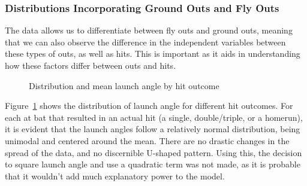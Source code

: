 \documentclass[
  letterpaper,
  DIV=11,
  numbers=noendperiod]{scrartcl}
\begin{document}
\subsubsection{Distributions Incorporating Ground Outs and Fly
Outs}\label{distributions-incorporating-ground-outs-and-fly-outs}

The data allows us to differentiate between fly outs and ground outs,
meaning that we can also observe the difference in the independent
variables between these types of outs, as well as hits. This is
important as it aids in understanding how these factors differ between
outs and hits.

\begin{figure}[H]


\caption{\label{fig-la-dist}Distribution and mean launch angle by hit
outcome}

\end{figure}%

Figure~\ref{fig-la-dist} shows the distribution of launch angle for
different hit outcomes. For each at bat that resulted in an actual hit
(a single, double/triple, or a homerun), it is evident that the launch
angles follow a relatively normal distribution, being unimodal and
centered around the mean. There are no drastic changes in the spread of
the data, and no discernible U-shaped pattern. Using this, the decision
to square launch angle and use a quadratic term was not made, as it is
probable that it wouldn't add much explanatory power to the model.
\end{document}
